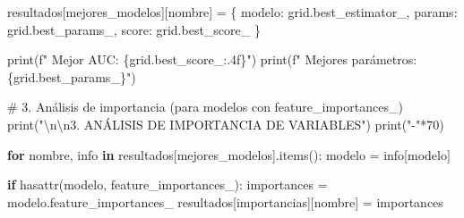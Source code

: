 \documentclass[
  doc,
  floatsintext,
  longtable,
  a4paper,
  nolmodern,
  notxfonts,
  notimes,
  12pt,
  colorlinks=true,linkcolor=blue,citecolor=blue,urlcolor=blue]{apa7}
\newenvironment{Shaded}{\begin{snugshade}}{\end{snugshade}}
\newcommand{\BuiltInTok}[1]{\textcolor[rgb]{0.00,0.23,0.31}{#1}}
\newcommand{\CharTok}[1]{\textcolor[rgb]{0.13,0.47,0.30}{#1}}
\newcommand{\CommentTok}[1]{\textcolor[rgb]{0.37,0.37,0.37}{#1}}
\newcommand{\ControlFlowTok}[1]{\textcolor[rgb]{0.00,0.23,0.31}{\textbf{#1}}}
\newcommand{\DecValTok}[1]{\textcolor[rgb]{0.68,0.00,0.00}{#1}}
\newcommand{\KeywordTok}[1]{\textcolor[rgb]{0.00,0.23,0.31}{\textbf{#1}}}
\newcommand{\NormalTok}[1]{\textcolor[rgb]{0.00,0.23,0.31}{#1}}
\newcommand{\OperatorTok}[1]{\textcolor[rgb]{0.37,0.37,0.37}{#1}}
\newcommand{\SpecialCharTok}[1]{\textcolor[rgb]{0.37,0.37,0.37}{#1}}
\newcommand{\SpecialStringTok}[1]{\textcolor[rgb]{0.13,0.47,0.30}{#1}}
\newcommand{\StringTok}[1]{\textcolor[rgb]{0.13,0.47,0.30}{#1}}
\begin{document}
\begin{Shaded}
\begin{Highlighting}[]
\NormalTok{            resultados[}\StringTok{\textquotesingle{}mejores\_modelos\textquotesingle{}}\NormalTok{][nombre] }\OperatorTok{=}\NormalTok{ \{}
                \StringTok{\textquotesingle{}modelo\textquotesingle{}}\NormalTok{: grid.best\_estimator\_,}
                \StringTok{\textquotesingle{}params\textquotesingle{}}\NormalTok{: grid.best\_params\_,}
                \StringTok{\textquotesingle{}score\textquotesingle{}}\NormalTok{: grid.best\_score\_}
\NormalTok{            \}}
            
            \BuiltInTok{print}\NormalTok{(}\SpecialStringTok{f"  Mejor AUC: }\SpecialCharTok{\{}\NormalTok{grid}\SpecialCharTok{.}\NormalTok{best\_score\_}\SpecialCharTok{:.4f\}}\SpecialStringTok{"}\NormalTok{)}
            \BuiltInTok{print}\NormalTok{(}\SpecialStringTok{f"  Mejores parámetros: }\SpecialCharTok{\{}\NormalTok{grid}\SpecialCharTok{.}\NormalTok{best\_params\_}\SpecialCharTok{\}}\SpecialStringTok{"}\NormalTok{)}
    
    \CommentTok{\# 3. Análisis de importancia (para modelos con feature\_importances\_)}
    \BuiltInTok{print}\NormalTok{(}\StringTok{"}\CharTok{\textbackslash{}n\textbackslash{}n}\StringTok{3. ANÁLISIS DE IMPORTANCIA DE VARIABLES"}\NormalTok{)}
    \BuiltInTok{print}\NormalTok{(}\StringTok{"{-}"}\OperatorTok{*}\DecValTok{70}\NormalTok{)}
    
    \ControlFlowTok{for}\NormalTok{ nombre, info }\KeywordTok{in}\NormalTok{ resultados[}\StringTok{\textquotesingle{}mejores\_modelos\textquotesingle{}}\NormalTok{].items():}
\NormalTok{        modelo }\OperatorTok{=}\NormalTok{ info[}\StringTok{\textquotesingle{}modelo\textquotesingle{}}\NormalTok{]}
        
        \ControlFlowTok{if} \BuiltInTok{hasattr}\NormalTok{(modelo, }\StringTok{\textquotesingle{}feature\_importances\_\textquotesingle{}}\NormalTok{):}
\NormalTok{            importances }\OperatorTok{=}\NormalTok{ modelo.feature\_importances\_}
\NormalTok{            resultados[}\StringTok{\textquotesingle{}importancias\textquotesingle{}}\NormalTok{][nombre] }\OperatorTok{=}\NormalTok{ importances}
            

\end{Highlighting}
\end{Shaded}
\end{document}
